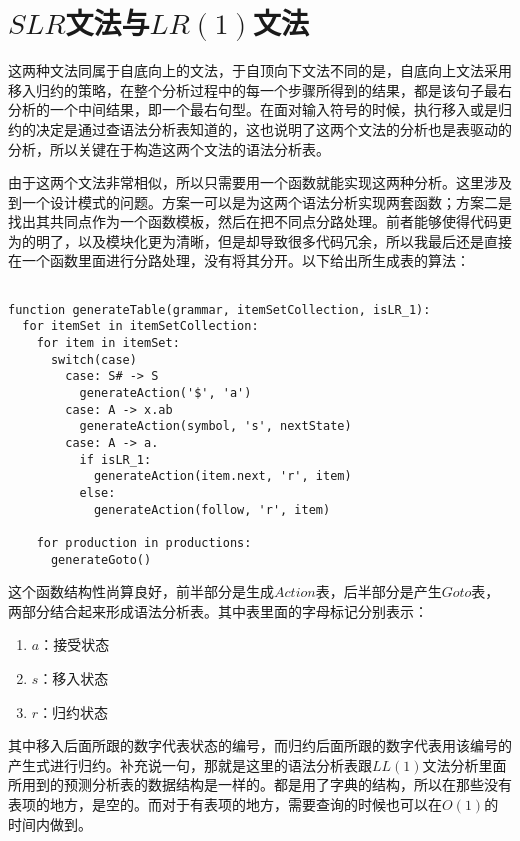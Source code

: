 \section{$SLR$文法与$LR(1)$文法}

这两种文法同属于自底向上的文法，于自顶向下文法不同的是，自底向上文法采用移入归约的策略，在整个分析过程中的每一个步骤所得到的结果，都是该句子最右分析的一个中间结果，即一个最右句型。在面对输入符号的时候，执行移入或是归约的决定是通过查语法分析表知道的，这也说明了这两个文法的分析也是表驱动的分析，所以关键在于构造这两个文法的语法分析表。

由于这两个文法非常相似，所以只需要用一个函数就能实现这两种分析。这里涉及到一个设计模式的问题。方案一可以是为这两个语法分析实现两套函数；方案二是找出其共同点作为一个函数模板，然后在把不同点分路处理。前者能够使得代码更为的明了，以及模块化更为清晰，但是却导致很多代码冗余，所以我最后还是直接在一个函数里面进行分路处理，没有将其分开。以下给出所生成表的算法：

\begin{verbatim}

function generateTable(grammar, itemSetCollection, isLR_1):
  for itemSet in itemSetCollection:
    for item in itemSet:
      switch(case)
        case: S# -> S
          generateAction('$', 'a')
        case: A -> x.ab
          generateAction(symbol, 's', nextState)
        case: A -> a.
          if isLR_1:
            generateAction(item.next, 'r', item)
          else:
            generateAction(follow, 'r', item)

    for production in productions:
      generateGoto()

\end{verbatim}

这个函数结构性尚算良好，前半部分是生成$Action$表，后半部分是产生$Goto$表，两部分结合起来形成语法分析表。其中表里面的字母标记分别表示：

\begin{enumerate}
    \item $a$：接受状态
    \item $s$：移入状态
    \item $r$：归约状态
\end{enumerate}

其中移入后面所跟的数字代表状态的编号，而归约后面所跟的数字代表用该编号的产生式进行归约。补充说一句，那就是这里的语法分析表跟$LL(1)$文法分析里面所用到的预测分析表的数据结构是一样的。都是用了字典的结构，所以在那些没有表项的地方，是空的。而对于有表项的地方，需要查询的时候也可以在$O(1)$的时间内做到。
